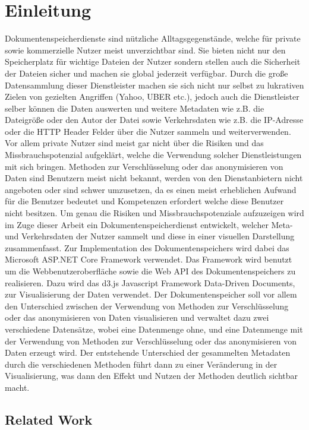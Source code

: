 \documentclass[
    fontsize=12pt,
    headings=small,
    parskip=half,           %
    bibliography=totoc,
    numbers=noenddot,       %
    open=any,               %
    ]{scrreprt}
\begin{document}
\chapter{Einleitung} \label{Kap:Einleitung}

Dokumentenspeicherdienste sind nützliche Alltagsgegenstände, welche für private sowie kommerzielle Nutzer meist unverzichtbar sind. 
Sie bieten nicht nur den Speicherplatz für wichtige Dateien der Nutzer sondern stellen auch die Sicherheit der Dateien sicher und machen sie global jederzeit verfügbar. 
Durch die große Datensammlung dieser Dienstleister machen sie sich nicht nur selbst zu lukrativen Zielen von gezielten Angriffen (Yahoo, UBER etc.), jedoch auch die Dienstleister selber können die Daten auswerten und weitere Metadaten wie z.B. die Dateigröße oder den Autor der Datei sowie Verkehrsdaten wie z.B. die IP-Adresse oder die \ac{HTTP} Header Felder über die Nutzer sammeln und weiterverwenden. 
Vor allem private Nutzer sind meist gar nicht über die Risiken und das Missbrauchspotenzial aufgeklärt, welche die Verwendung solcher Dienstleistungen mit sich bringen. 
Methoden zur Verschlüsselung oder das anonymisieren von Daten sind Benutzern meist nicht bekannt, werden von den Dienstanbietern nicht angeboten oder sind schwer umzusetzen, da es einen meist erheblichen Aufwand für die Benutzer bedeutet und Kompetenzen erfordert welche diese Benutzer nicht besitzen. 
Um genau die Risiken und Missbrauchspotenziale aufzuzeigen wird im Zuge dieser Arbeit ein Dokumentenspeicherdienst entwickelt, welcher Meta- und Verkehrsdaten der Nutzer sammelt und diese in einer visuellen Darstellung zusammenfasst. 
Zur Implementation des Dokumentenspeichers wird dabei das Microsoft ASP.NET Core Framework verwendet. 
Das Framework wird benutzt um die Webbenutzeroberfläche sowie die Web \ac{API} des Dokumentenspeichers zu realisieren. 
Dazu wird das \ac{d3.js} Javascript Framework Data-Driven Documents, zur Visualisierung der Daten verwendet. 
Der Dokumentenspeicher soll vor allem den Unterschied zwischen der Verwendung von Methoden zur Verschlüsselung oder das anonymisieren von Daten visualisieren und verwaltet dazu zwei verschiedene Datensätze, wobei eine Datenmenge ohne, und eine Datenmenge mit der Verwendung von Methoden zur Verschlüsselung oder das anonymisieren von Daten erzeugt wird. Der entstehende Unterschied der gesammelten Metadaten durch die verschiedenen Methoden führt dann zu einer Veränderung in der Visualisierung, was dann den Effekt und Nutzen der Methoden deutlich sichtbar macht.  
\section{Related Work}
\end{document}
